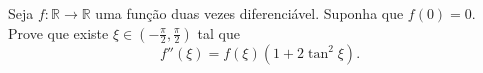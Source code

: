 Seja \(f\colon \mathbb{R} \to \mathbb{R}\) uma função duas vezes diferenciável.
Suponha que \(f(0) = 0\).
Prove que existe \(\xi \in (-\frac{\pi}{2}, \frac{\pi}{2})\) tal que
\[f''(\xi) = f(\xi)(1 + 2\tan^2 \xi).\]
